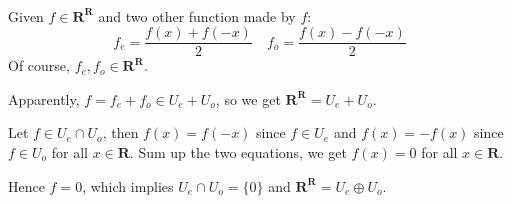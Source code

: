 \documentclass[a4paper]{article}
\begin{document}
\paragraph{}
Given $f\in \mathbf{R^R}$ and two other function made by $f$:
\[
    f_e = \frac{f(x) + f(-x)}{2} \quad f_o = \frac{f(x) - f(-x)}{2}
\]
Of course, $f_e,f_o\in \mathbf{R^R}$.

Apparently, $f = f_e + f_o \in U_e + U_o$, so we get $\mathbf{R^R} = U_e + U_o$.

Let $f \in U_e\cap U_o$, then $f(x) = f(-x)$ since $f\in U_e$ and $f(x) = -f(x)$ since $f\in U_o$
for all $x\in \mathbf {R}$. Sum up the two equations, we get $f(x) = 0$ for all $x\in \mathbf{R}$.

Hence $f = 0$, which implies $U_e\cap U_o = \{0\}$ and $\mathbf{R^R} = U_e \oplus U_o$.
\end{document}
